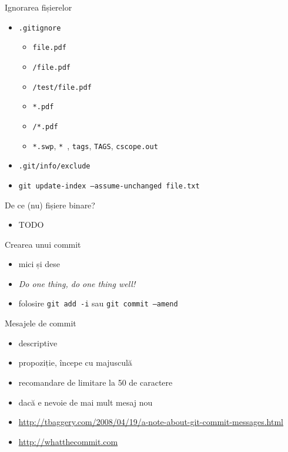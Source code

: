 \documentclass{beamer}
\begin{document}
\begin{frame}{Ignorarea fișierelor}
  \begin{itemize}
    \item \texttt{.gitignore}
      \begin{itemize}
	\item \texttt{file.pdf}
	\item \texttt{/file.pdf}
	\item \texttt{/test/file.pdf}
	\item \texttt{*.pdf}
	\item \texttt{/*.pdf}
	\item \texttt{*.swp}, \texttt{*~}, \texttt{tags}, \texttt{TAGS},
	  \texttt{cscope.out}
      \end{itemize}
    \item \texttt{.git/info/exclude}
    \item \texttt{git update-index --assume-unchanged file.txt}
  \end{itemize}
\end{frame}

\begin{frame}{De ce (nu) fișiere binare?}
  \begin{itemize}
    \item TODO
  \end{itemize}
\end{frame}

\begin{frame}{Crearea unui commit}
  \begin{itemize}
    \item mici și dese
    \item \textit{Do one thing, do one thing well!}
    \item folosire \texttt{git add -i} sau \texttt{git commit --amend}
  \end{itemize}
\end{frame}

\begin{frame}{Mesajele de commit}
  \begin{itemize}
    \item descriptive
    \item propoziție, începe cu majusculă
    \item recomandare de limitare la 50 de caractere
    \item dacă e nevoie de mai mult mesaj nou
    \item
      \url{http://tbaggery.com/2008/04/19/a-note-about-git-commit-messages.html}
    \item \url{http://whatthecommit.com}
  \end{itemize}
\end{frame}
\end{document}
